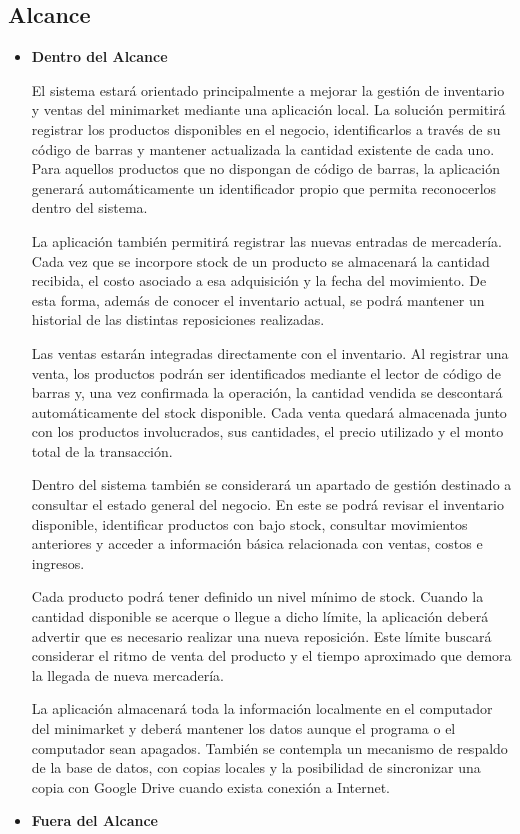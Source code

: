 \documentclass[10pt,a4paper]{article}
\begin{document}
\subsection{Alcance}
\begin{itemize} 
\item \textbf{Dentro del Alcance}

El sistema estará orientado principalmente a mejorar la gestión de inventario y ventas del minimarket mediante una aplicación local. La solución permitirá registrar los productos disponibles en el negocio, identificarlos a través de su código de barras y mantener actualizada la cantidad existente de cada uno. Para aquellos productos que no dispongan de código de barras, la aplicación generará automáticamente un identificador propio que permita reconocerlos dentro del sistema.

La aplicación también permitirá registrar las nuevas entradas de mercadería. Cada vez que se incorpore stock de un producto se almacenará la cantidad recibida, el costo asociado a esa adquisición y la fecha del movimiento. De esta forma, además de conocer el inventario actual, se podrá mantener un historial de las distintas reposiciones realizadas.

Las ventas estarán integradas directamente con el inventario. Al registrar una venta, los productos podrán ser identificados mediante el lector de código de barras y, una vez confirmada la operación, la cantidad vendida se descontará automáticamente del stock disponible. Cada venta quedará almacenada junto con los productos involucrados, sus cantidades, el precio utilizado y el monto total de la transacción.

Dentro del sistema también se considerará un apartado de gestión destinado a consultar el estado general del negocio. En este se podrá revisar el inventario disponible, identificar productos con bajo stock, consultar movimientos anteriores y acceder a información básica relacionada con ventas, costos e ingresos.

Cada producto podrá tener definido un nivel mínimo de stock. Cuando la cantidad disponible se acerque o llegue a dicho límite, la aplicación deberá advertir que es necesario realizar una nueva reposición. Este límite buscará considerar el ritmo de venta del producto y el tiempo aproximado que demora la llegada de nueva mercadería.

La aplicación almacenará toda la información localmente en el computador del minimarket y deberá mantener los datos aunque el programa o el computador sean apagados. También se contempla un mecanismo de respaldo de la base de datos, con copias locales y la posibilidad de sincronizar una copia con Google Drive cuando exista conexión a Internet.
\item \textbf{Fuera del Alcance}


\end{itemize}
\end{document}
